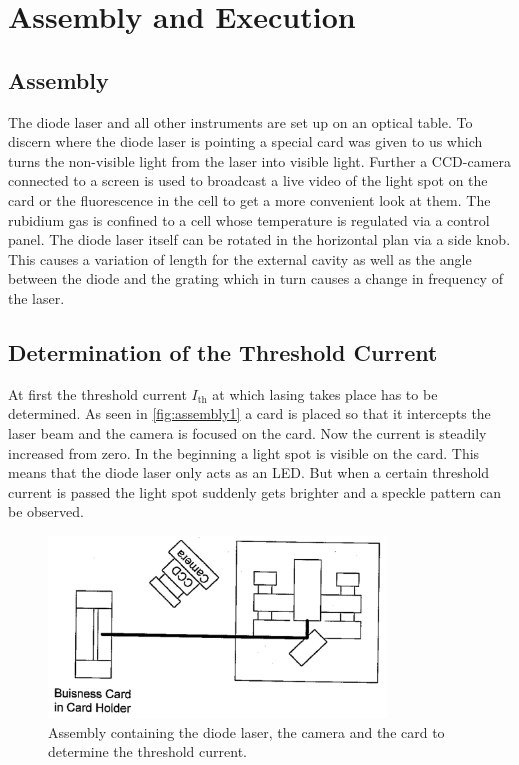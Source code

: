 \section{Assembly and Execution}
\label{sec:Durchfuehrung}
\subsection{Assembly}
The diode laser and all other instruments are set up on an optical table.
To discern where the diode laser is pointing a special card was given to us which turns the non-visible light from the laser into visible light.
Further a CCD-camera connected to a screen is used to broadcast a live video of the light spot on the card or the fluorescence in the cell to get a more convenient look at them.
The rubidium gas is confined to a cell whose temperature is regulated via a control panel.
The diode laser itself can be rotated in the horizontal plan via a side knob.
This causes a variation of length for the external cavity as well as the angle between the diode and the grating which in turn causes a change in frequency of the laser.

\subsection{Determination of the Threshold Current}
\label{sec:threshold}
At first the threshold current $I_{\text{th}}$ at which lasing takes place has to be determined.
As seen in \autoref{fig:assembly1} a card is placed so that it intercepts the laser beam and the camera is focused on the card.
Now the current is steadily increased from zero.
In the beginning a light spot is visible on the card.
This means that the diode laser only acts as an LED.
But when a certain threshold current is passed the light spot suddenly gets brighter and a speckle pattern can be observed.
\begin{figure}
    \center
    \includegraphics[width=0.8\textwidth]{bilder/Assembly_1.png}
    \caption{Assembly containing the diode laser, the camera and the card to determine the threshold current. \cite{anleitung}}
    \label{fig:assembly1}
\end{figure}

